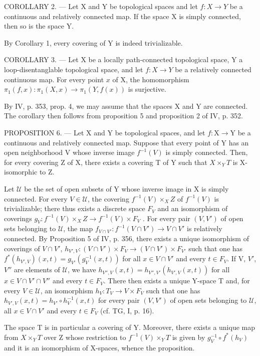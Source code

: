 COROLLARY 2. --- Let X and Y be topological spaces and let \(f: X \to Y\) be a continuous and relatively connected map. If the space X is simply connected, then so is the space Y.

By Corollary 1, every covering of Y is indeed trivializable.

COROLLARY 3. --- Let X be a locally path-connected topological space, Y a loop-disentanglable topological space, and let \(f: X \to Y\) be a relatively connected continuous map. For every point \(x\) of X, the homomorphism \(\pi_1(f, x): \pi_1(X, x) \to \pi_1(Y, f(x))\) is surjective.

By IV, p. 353, prop. 4, we may assume that the spaces X and Y are connected. The corollary then follows from proposition 5 and proposition 2 of IV, p. 352.

PROPOSITION 6. --- Let X and Y be topological spaces, and let \(f: \mathrm{X} \to \mathrm{Y}\) be a continuous and relatively connected map. Suppose that every point of Y has an open neighborhood V whose inverse image \(f^{-1}(V)\) is simply connected. Then, for every covering Z of X, there exists a covering T of Y such that \(X \times_{Y} T\) is X-isomorphic to Z.

Let \(\mathcal{U}\) be the set of open subsets of Y whose inverse image in X is simply connected. For every \(V \in \mathcal{U}\), the covering \(f^{-1}(V) \times_{X} Z\) of \(f^{-1}(V)\) is trivializable; there thus exists a discrete space \(F_V\) and an isomorphism of coverings \(g_V: f^{-1}(V) \times_{X} Z \to f^{-1}(V) \times F_V\) . For every pair \((V, V')\) of open sets belonging to \(\mathcal{U}\), the map \(f_{V \cap V'}: f^{-1}(V \cap V') \to V \cap V'\) is relatively connected. By Proposition 5 of IV, p. 356, there exists a unique isomorphism of coverings of \(V \cap V'\), \(h_{V',V}: (V \cap V') \times F_V \to (V \cap V') \times F_{V'}\) such that one has \(f^*(h_{V',V})(x,t) = g_{V'}(g_V^{-1}(x,t))\) for all \(x \in V \cap V'\) and every \(t \in F_V\). If V, \(V'\), \(V''\) are elements of \(\mathcal{U}\), we have \(h_{V'',V}(x,t) = h_{V'',V'}(h_{V',V}(x,t))\) for all \(x \in V \cap V' \cap V''\) and every \(t \in F_V\). There then exists a unique Y-space T and, for every \(V \in \mathcal{U}\), an isomorphism \(h_V: T_V \to V \times F_V\) such that one has \(h_{V',V}(x,t) = h_{V'} \circ h_V^{-1}(x,t)\) for every pair \((V, V')\) of open sets belonging to \(\mathcal{U}\), all \(x \in V \cap V'\) and every \(t \in F_V\) (cf. TG, I, p. 16).

The space T is in particular a covering of Y. Moreover, there exists a unique map from \(X \times_{Y} T\) over Z whose restriction to \(f^{-1}(V) \times_{Y} T\) is given by \(g_{V}^{-1} \circ f^{*}(h_{V})\) and it is an isomorphism of X-spaces, whence the proposition.

